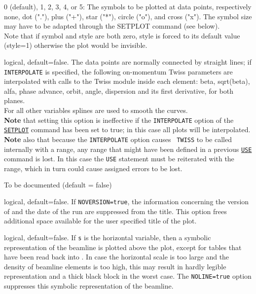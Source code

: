 \begin{madlist}
    0 (default), 1, 2, 3, 4, or 5: The symbols to be
     plotted at data points, respectively none, dot ("."), plus ("+"),
     star ("*"), circle ("o"), and cross ("x").  
     The symbol size may have to be adapted through the SETPLOT command
     (see below). \\ 
     Note that if symbol and style are both zero, style is
     forced to its default value (style=1) otherwise the plot would be
     invisible. 

    logical, default=false. The data points are
     normally connected by straight lines; if {\tt INTERPOLATE} is
     specified, the following on-momentum Twiss parameters are
     interpolated with calls to the Twiss module inside 
     each element: beta, sqrt(beta), alfa, phase advance, orbit, angle,
     dispersion and its first derivative, for both planes. \\ 
     For all other variables splines are used to smooth
     the curves. \\ 
     {\bf Note} that setting this option is ineffective if the {\tt INTERPOLATE}
     option of the \hyperref[sec:setplot]{\tt SETPLOT} command has been set to 
     true; in this case all plots will be interpolated. \\
     {\bf Note} also that because the {\tt INTERPOLATE} option causes {\tt 
     TWISS} to be called internally with a range, any range that might have 
     been defined in a previous \hyperref[sec:use]{\tt USE} command is lost. In 
     this case the {\tt USE} statement must be reiterated with the range, which 
     in turn could cause assigned errors to be lost.


    To be documented (default = false)

    logical, default=false. If {\tt NOVERSION=true}, the
     information concerning the version of \madx and the date of the run
     are suppressed from the title.  
     This option frees additional space available for the user specified
     title of the plot.  

    logical, default=false. If {\tt s} is the horizontal
     variable, then a symbolic representation of the beamline is plotted
     above the plot, except for tables that have been read back into \madx. 
     In case the horizontal scale is too large and the density of
     beamline elements is too high, this may result in hardly legible
     representation and a thick black block in the worst case. 
     The {\tt NOLINE=true} option suppresses this symbolic representation 
     of the beamline. 


\end{madlist}
